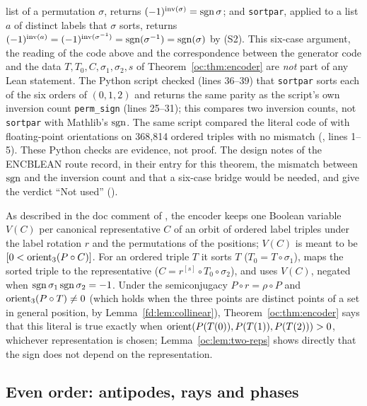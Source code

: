 \begin{remark}
list of a permutation $\sigma$, returns $(-1)^{\mathrm{inv}(\sigma)}=\operatorname{sgn}\sigma$; and \texttt{sortpar},
applied to a list $a$ of distinct labels that $\sigma$ sorts, returns
$(-1)^{\mathrm{inv}(a)}=(-1)^{\mathrm{inv}(\sigma^{-1})}=\operatorname{sgn}(\sigma^{-1})=\operatorname{sgn}(\sigma)$ by (S2). This
six-case argument, the reading of the code above and the correspondence between the generator code and
the data $T,T_0,C,\sigma_1,\sigma_2,s$ of Theorem~\ref{oc:thm:encoder} are \emph{not} part of any Lean
statement.
The Python script  checked (lines 36--39) that \texttt{sortpar}
sorts each of the six orders of $(0,1,2)$ and returns the same parity as the script's own inversion
count \texttt{perm\_sign} (lines 25--31); this compares two inversion counts, not \texttt{sortpar} with
Mathlib's $\operatorname{sgn}$. The same script compared the literal code of  with
floating-point orientations on 368,814 ordered triples with no mismatch
(, lines 1--5). These Python checks are evidence, not
proof. The design notes of the ENCBLEAN route record, in their entry for this theorem, the mismatch
between $\operatorname{sgn}$ and the inversion count and that a six-case bridge would be needed, and give the verdict
``Not used'' ().
\end{remark}

\begin{remark}\label{oc:rem:literal-use}
As described in the doc comment of , the encoder keeps one Boolean variable
$V(C)$ per canonical representative $C$ of an orbit of ordered label triples under the label rotation $r$
and the permutations of the positions; $V(C)$ is meant to be $[0<\operatorname{orient}_3(P\circ C)]$. For an ordered
triple $T$ it sorts $T$ ($T_0=T\circ\sigma_1$), maps the sorted triple to the representative
($C=r^{[s]}\circ T_0\circ\sigma_2$), and uses $V(C)$, negated when $\operatorname{sgn}\sigma_1\operatorname{sgn}\sigma_2=-1$. Under the semiconjugacy $P\circ r=\rho\circ P$ and
$\operatorname{orient}_3(P\circ T)\ne0$ (which holds when the three points are distinct points of a set in general
position, by Lemma~\ref{fd:lem:collinear}), Theorem~\ref{oc:thm:encoder} says that this literal is true
exactly when $\operatorname{orient}(P(T(0)),P(T(1)),P(T(2)))>0$, whichever representation is chosen;
Lemma~\ref{oc:lem:two-reps} shows directly that the sign does not depend on the representation.
\end{remark}

\subsection{Even order: antipodes, rays and phases}\label{oc:sub:even}

